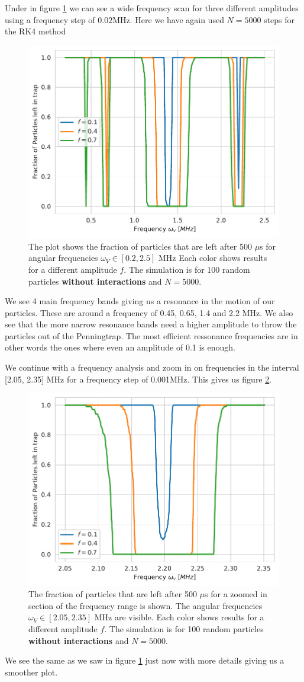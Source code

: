\documentclass[english,notitlepage,reprint,nofootinbib]{revtex4-1}  %
\begin{document}
Under in figure \ref{fig:wide_freq_p_left_N_5000} we can see a wide frequency scan for three different amplitudes using a frequency step of $0.02$MHz.
Here we have again used $N=5000$ steps for the RK4 method
\begin{figure}[H]
    \centering
    \includegraphics[width=.5\textwidth]{../figures/wide_freq_p_left_N_5000.pdf}
    \caption{The plot shows the fraction of particles that are left after 500 $\mu$s for angular frequencies $\omega_V \in [0.2,2.5]$ MHz Each color shows results for a different amplitude $f$. The simulation is for 100 random particles \textbf{without interactions} and $N = 5000$.}
    \label{fig:wide_freq_p_left_N_5000}
\end{figure}
We see 4 main frequency bands giving us a resonance in the motion of our particles. These are around a frequency of 0.45, 0.65, 1.4 and 2.2 MHz. We also see that the more narrow resonance bands need a higher amplitude to throw the particles out of the Penningtrap. The most efficient ressonance frequencies are in other words the ones where even an amplitude of 0.1 is enough.

We continue with a frequency analysis and zoom in on frequencies in the interval [2.05, 2.35] MHz for a frequency step of 0.001MHz. This gives us figure \ref{fig:narrow_freq_p_left_N_5000_zoom}.
\begin{figure}[H]
    \centering
    \includegraphics[width=.5\textwidth]{../figures/narrow_freq_p_left_N_5000_zoom.pdf}
    \caption{The fraction of particles that are left after 500 $\mu$s for a zoomed in section of the frequency range is shown. The angular frequencies $\omega_V \in [2.05,2.35]$ MHz are visible. Each color shows results for a different amplitude $f$. The simulation is for 100 random particles \textbf{without interactions} and $N = 5000$.}
    \label{fig:narrow_freq_p_left_N_5000_zoom}
\end{figure}
We see the same as we saw in figure \ref{fig:wide_freq_p_left_N_5000} just now with more details giving us a smoother plot.
\end{document}
